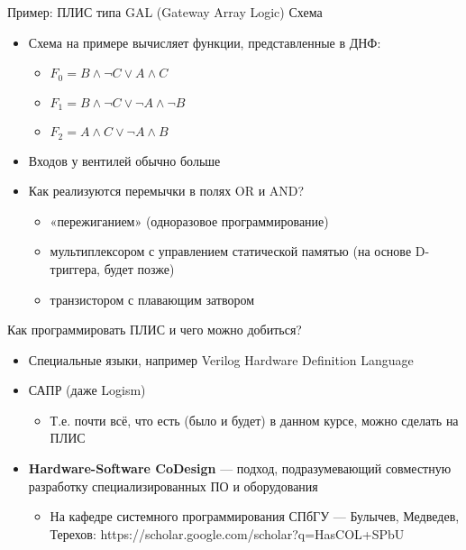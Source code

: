 \documentclass[xetex,aspectratio=43]{beamer}
\begin{document}
\begin{frame}{Пример: ПЛИС типа GAL (Gateway Array Logic)}
    \alert{Схема}

    \begin{itemize}
        \tightlist
        \item
        Схема на примере вычисляет функции, представленные в ДНФ:

        \begin{itemize}
            \tightlist
            \item
            \(F_0 = B \wedge\neg C \vee A\wedge C\)
            \item
            \(F_1 = B \wedge\neg C \vee \neg A \wedge \neg B\)
            \item
            \(F_2 = A\wedge C \vee \neg A \wedge B\)
        \end{itemize}
        \item
        Входов у вентилей обычно больше
        \item
        Как реализуются перемычки в полях OR и AND?

        \begin{itemize}
            \tightlist
            \item
            «пережиганием» (одноразовое программирование)
            \item
            мультиплексором с управлением статической памятью (на основе
            D-триггера, будет позже)
            \item
            транзистором с плавающим затвором
        \end{itemize}
    \end{itemize}
\end{frame}

\begin{frame}{Как программировать ПЛИС и чего можно добиться?}
        \begin{itemize}
            \tightlist
            \item
            Специальные языки, например Verilog Hardware Definition Language
            \item
            САПР (даже Logism)

            \begin{itemize}
                \tightlist
                \item
                Т.е. почти всё, что есть (было и будет) в данном курсе, можно
                сделать на ПЛИС
            \end{itemize}
            \item
            \textbf{Hardware-Software CoDesign} --- подход, подразумевающий
            совместную разработку специализированных ПО и оборудования

            \begin{itemize}
                \tightlist
                \item
                На кафедре системного программирования СПбГУ --- Булычев, Медведев,
                Терехов: https://scholar.google.com/scholar?q=HasCOL+SPbU
            \end{itemize}
        \end{itemize}
\end{frame}
\end{document}
